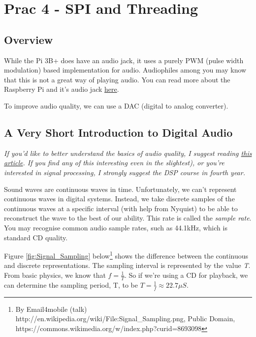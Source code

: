 \newpage
\section{Prac 4 - SPI and Threading}
\subsection{Overview}
While the Pi 3B+ does have an audio jack, it uses a purely PWM (pulse width modulation) based implementation for audio. Audiophiles among you may know that this is not a great way of playing audio. You can read more about the Raspberry Pi and it's audio jack \href{https://hackaday.com/2018/07/13/behind-the-pin-how-the-raspberry-pi-gets-its-audio/}{here}.

To improve audio quality, we can use a DAC (digital to analog converter). 

\subsection{A Very Short Introduction to Digital Audio}
\textit{If you'd like to better understand the basics of audio quality, I suggest reading \href{https://medium.com/@MicroPyramid/understanding-audio-quality-bit-rate-sample-rate-14286953d71f}{this article}. If you find any of this interesting even in the slightest), or you're interested in signal processing, I strongly suggest the DSP course in fourth year.}

Sound waves are continuous waves in time. Unfortunately, we can't represent continuous waves in digital systems. Instead, we take discrete samples of the continuous waves at a specific interval (with help from Nyquist) to be able to reconstruct the wave to the best of our ability. This rate is called the \textit{sample rate}. You may recognise common audio sample rates, such as 44.1kHz, which is standard CD quality.

Figure \ref{fig:Signal_Sampling} below\footnote{By Email4mobile (talk) http://en.wikipedia.org/wiki/File:Signal\_Sampling.png, Public Domain, https://commons.wikimedia.org/w/index.php?curid=8693098} shows the difference between the continuous and discrete representations. The sampling interval is represented by the value \textit{T}. From basic physics, we know that $f = \frac{1}{T}$. So if we're using a CD for playback, we can determine the sampling period, T, to be $T = \frac{1}{f} \approx 22.7 \mu S$.

